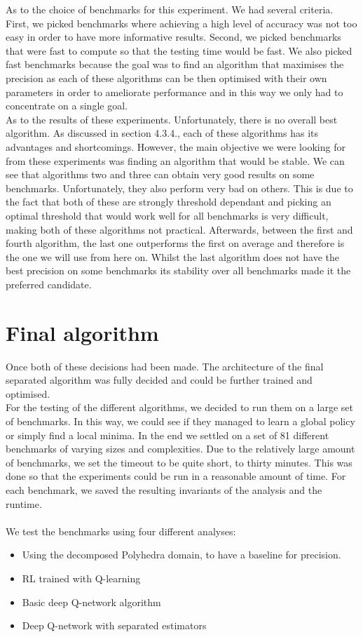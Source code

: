 As to the choice of benchmarks for this experiment. We had several criteria. First, we picked benchmarks where achieving a high level of accuracy was not too easy in order to have more informative results. Second, we picked benchmarks that were fast to compute so that the testing time would be fast. We also picked fast benchmarks because the goal was to find an algorithm that maximises the precision as each of these algorithms can be then optimised with their own parameters in order to ameliorate performance and in this way we only had to concentrate on a single goal.\\
As to the results of these experiments. Unfortunately, there is no overall best algorithm. As discussed in section 4.3.4., each of these algorithms has its advantages and shortcomings. However, the main objective we were looking for from these experiments was finding an algorithm that would be stable. We can see that algorithms two and three can obtain very good results on some benchmarks. Unfortunately, they also perform very bad on others. This is due to the fact that both of these are strongly threshold dependant and picking an optimal threshold that would work well for all benchmarks is very difficult, making both of these algorithms not practical. Afterwards, between the first and fourth algorithm, the last one outperforms the first on average and therefore is the one we will use from here on. Whilst the last algorithm does not have the best precision on some benchmarks its stability over all benchmarks made it the preferred candidate.


\section{Final algorithm}
Once both of these decisions had been made. The architecture of the final separated algorithm was fully decided and could be further trained and optimised.\\
For the testing of the different algorithms, we decided to run them on a large set of benchmarks. In this way, we could see if they managed to learn a global policy or simply find a local minima. In the end we settled on a set of 81 different benchmarks of varying sizes and complexities. Due to the relatively large amount of benchmarks, we set the timeout to be quite short, to thirty minutes. This was done so that the experiments could be run in a reasonable amount of time. For each benchmark, we saved the resulting invariants of the analysis and the runtime.\\
\mbox{}\\
We test the benchmarks using four different analyses:
\begin{itemize}
	\item Using the decomposed Polyhedra domain, to have a baseline for precision.
	\item RL trained with Q-learning
	\item Basic deep Q-network algorithm
	\item Deep Q-network with separated estimators
\end{itemize}

